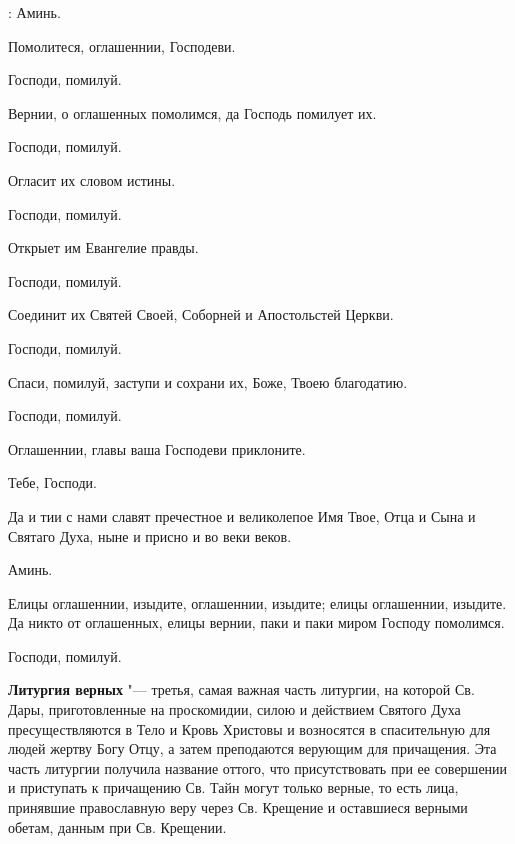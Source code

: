 \begin{mymulticols}
: Аминь. 


 Помолитеся, оглашеннии, Господеви.

 Господи, помилуй.

 Вернии, о оглашенных помолимся, да Господь помилует их.

 Господи, помилуй.

 Огласит их словом истины.

 Господи, помилуй.

 Открыет им Евангелие правды.

 Господи, помилуй.

 Соединит их Святей Своей, Соборней и Апостольстей Церкви.

 Господи, помилуй.

 Спаси, помилуй, заступи и сохрани их, Боже, Твоею благодатию.

 Господи, помилуй.

 Оглашеннии, главы ваша Господеви приклоните.

 Тебе, Господи.

 Да и тии с нами славят пречестное и великолепое Имя Твое, Отца и Сына и Святаго Духа, ныне и присно и во веки веков.

 Аминь.

 Елицы оглашеннии, изыдите, оглашеннии, изыдите; елицы оглашеннии, изыдите. Да никто от оглашенных, елицы вернии, паки и паки миром Господу помолимся.

 Господи, помилуй.


\end{mymulticols}

\mychapterending


{\bfseries Литургия верных} "--- третья, самая важная часть литургии, на которой Св. Дары, приготовленные на проскомидии, силою и действием Святого Духа пресуществляются в Тело и Кровь Христовы и возносятся в спасительную для людей жертву Богу Отцу, а затем преподаются верующим для причащения. Эта часть литургии получила название оттого, что присутствовать при ее совершении и приступать к причащению Св. Тайн могут только верные, то есть лица, принявшие православную веру через Св. Крещение и оставшиеся верными обетам, данным при Св. Крещении.

